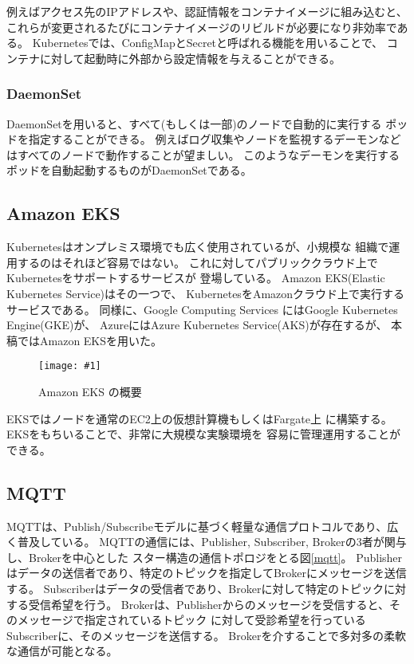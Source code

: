 \documentclass[submit,techrep]{ipsj}
\newcommand{\reffig}[1]{図\ref{#1}}
\newcommand{\epsfig}[4]{
\begin{figure}[tb]
  \begin{center}
    \texttt{[image: \#1]}
  \end{center}
  \caption{#3}
  \label{#4}
\end{figure}}
\newcommand{\kbs}{Kubernetes}
\begin{document}
例えばアクセス先のIPアドレスや、認証情報をコンテナイメージに組み込むと、
これらが変更されるたびにコンテナイメージのリビルドが必要になり非効率である。
\kbs では、ConfigMapとSecretと呼ばれる機能を用いることで、
コンテナに対して起動時に外部から設定情報を与えることができる。


\subsubsection{DaemonSet}
DaemonSetを用いると、すべて(もしくは一部)のノードで自動的に実行する
ポッドを指定することができる。
例えばログ収集やノードを監視するデーモンなどはすべてのノードで動作することが望ましい。
このようなデーモンを実行するポッドを自動起動するものがDaemonSetである。

\subsection{Amazon EKS}
\kbs はオンプレミス環境でも広く使用されているが、小規模な
組織で運用するのはそれほど容易ではない。
これに対してパブリッククラウド上で\kbs をサポートするサービスが
登場している。
%
Amazon EKS(Elastic Kubernetes Service)\cite{EKS}はその一つで、
KubernetesをAmazonクラウド上で実行するサービスである。
同様に、Google Computing Services にはGoogle Kubernetes Engine(GKE)\cite{gks}が、
AzureにはAzure Kubernetes Service(AKS)\cite{aks}が存在するが、
本稿ではAmazon EKSを用いた。

\epsfig{figs/eks.pdf}{width=8.5cm}{Amazon EKS の概要}{eks}

EKSではノードを通常のEC2上の仮想計算機もしくはFargate\cite{fargate}上
に構築する。EKSをもちいることで、非常に大規模な実験環境を
容易に管理運用することができる。



\subsection{MQTT}
MQTT\cite{MQTT}は、Publish/Subscribeモデルに基づく軽量な通信プロトコルであり、広く普及している。
MQTTの通信には、Publisher, Subscriber, Brokerの3者が関与し、Brokerを中心とした
スター構造の通信トポロジをとる\reffig{mqtt}。
Publisherはデータの送信者であり、特定のトピックを指定してBrokerにメッセージを送信する。
Subscriberはデータの受信者であり、Brokerに対して特定のトピックに対する受信希望を行う。
Brokerは、Publisherからのメッセージを受信すると、そのメッセージで指定されているトピック
に対して受診希望を行っているSubscriberに、そのメッセージを送信する。
Brokerを介することで多対多の柔軟な通信が可能となる。
\end{document}
